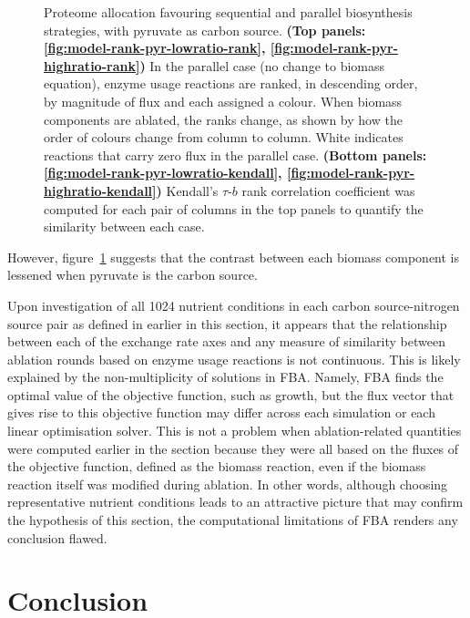 \begin{figure}
  \caption{
    Proteome allocation favouring sequential and parallel biosynthesis strategies, with pyruvate as carbon source.
    \textbf{(Top panels: \ref{fig:model-rank-pyr-lowratio-rank}, \ref{fig:model-rank-pyr-highratio-rank})} In the parallel case (no change to biomass equation), enzyme usage reactions are ranked, in descending order, by magnitude of flux and each assigned a colour.
    When biomass components are ablated, the ranks change, as shown by how the order of colours change from column to column.
    White indicates reactions that carry zero flux in the parallel case.
    \textbf{(Bottom panels: \ref{fig:model-rank-pyr-lowratio-kendall}, \ref{fig:model-rank-pyr-highratio-kendall})} Kendall's $\tau$-$b$ rank correlation coefficient was computed for each pair of columns in the top panels to quantify the similarity between each case.
  }
  \label{fig:model-rank-pyr}
\end{figure}

However, figure~\ref{fig:model-rank-pyr} suggests that the contrast between each biomass component is lessened when pyruvate is the carbon source.

Upon investigation of all \num{1024} nutrient conditions in each carbon source-nitrogen source pair as defined in earlier in this section, it appears that the relationship between each of the exchange rate axes and any measure of similarity between ablation rounds based on enzyme usage reactions is not continuous.
This is likely explained by the non-multiplicity of solutions in FBA.
Namely, FBA finds the optimal value of the objective function, such as growth, but the flux vector that gives rise to this objective function may differ across each simulation or each linear optimisation solver.
This is not a problem when ablation-related quantities were computed earlier in the section because they were all based on the fluxes of the objective function, defined as the biomass reaction, even if the biomass reaction itself was modified during ablation.
In other words, although choosing representative nutrient conditions leads to an attractive picture that may confirm the hypothesis of this section, the computational limitations of FBA renders any conclusion flawed.

\section{Conclusion}
\label{subsec:model-conclusion}

